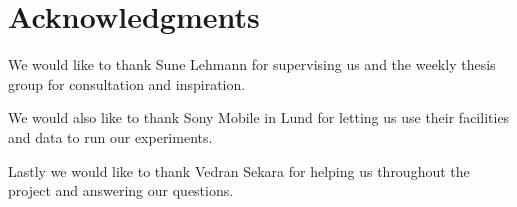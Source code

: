 \chapter{Acknowledgments}
We would like to thank Sune Lehmann for supervising us and the weekly thesis group for consultation and inspiration.

We would also like to thank Sony Mobile in Lund for letting us use their facilities and data to run our experiments.

Lastly we would like to thank Vedran Sekara for helping us throughout the project and answering our questions.


